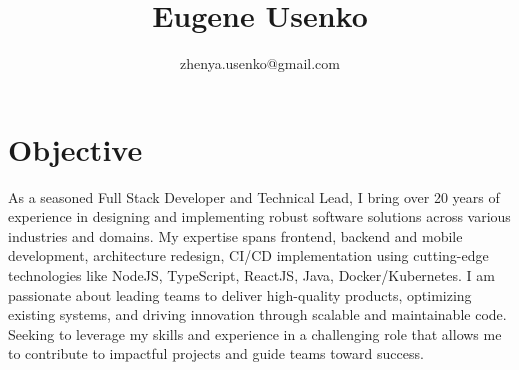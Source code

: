 \documentclass[10pt]{article}
\title{\bfseries Eugene Usenko}
\author{zhenya.usenko@gmail.com}
\date{}
\begin{document}
\maketitle
 
\section*{Objective}
As a seasoned Full Stack Developer and Technical Lead, I bring over 20 years of experience in designing and implementing robust software solutions across various industries and domains. My expertise spans frontend, backend and mobile development, architecture redesign, CI/CD implementation using cutting-edge technologies like NodeJS, TypeScript, ReactJS, Java, Docker/Kubernetes. I am passionate about leading teams to deliver high-quality products, optimizing existing systems, and driving innovation through scalable and maintainable code. Seeking to leverage my skills and experience in a challenging role that allows me to contribute to impactful projects and guide teams toward success.
 
\end{document}
